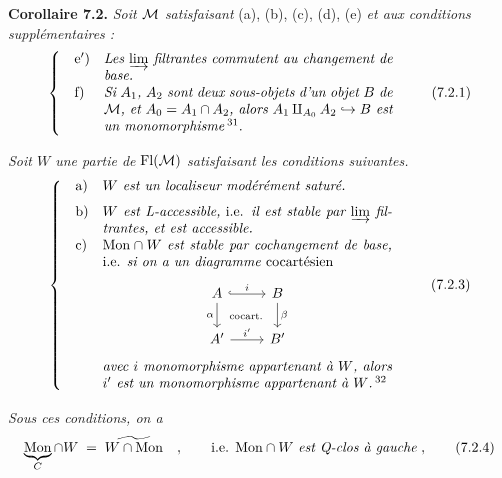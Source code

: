 \textbf{Corollaire 7.2.} \textit{Soit $\mathcal{M}$ satisfaisant} (a), (b), (c), (d), (e) \textit{et aux conditions supplémentaires :}
\[
\left\{
\begin{array}{@{\quad}l@{\quad}p{0.6\textwidth}}
\text{e$'$)} & \textit{Les $\varinjlim$ filtrantes commutent au changement de base.} \\[1.5ex]
\text{f)} & \textit{Si $A_1$, $A_2$ sont deux sous-objets d'un objet $B$ de $\M$, et $A_0 = A_1 \cap A_2$, alors $A_1 \amalg_{A_0} A_2 \hookrightarrow B$ est un monomorphisme}\,\footnotemark[31].
\end{array}
\right.
\tag*{(7.2.1)}
\]

\textit{Soit $W$ une partie de} $\mathrm{Fl}(\mathcal{M})$ \textit{satisfaisant les conditions suivantes.}
\[
\left\{
\begin{array}{@{\quad}l@{\quad}p{0.6\textwidth}}
\text{a)} & \textit{$W$ est un localiseur modérément saturé.} \\[1.5ex]
\text{b)} & \textit{$W$ est L-accessible,} i.e. \textit{il est stable par $\varinjlim$ filtrantes, et est accessible.} \\[1.5ex]
\text{c)} & $\Mon \cap W$ \textit{est stable par cochangement de base,} i.e. \textit{si on a un diagramme} cocartésien
\begin{center}
\begin{tikzcd}[ampersand replacement=\&]
A \arrow[r, hook, "i"] \arrow[d, "\alpha"'] \arrow[dr, phantom, "\scriptstyle\text{cocart.}"] \& B \arrow[d, "\beta"] \\
A' \arrow[r, "i'"] \& B'
\end{tikzcd}
\end{center}
\textit{avec $i$ monomorphisme appartenant à $W$, alors $i'$ est un monomorphisme appartenant à $W$.}\,\footnotemark[32]
\end{array}
\right.
\tag*{(7.2.3)}
\]

\textit{Sous ces conditions, on a}
\[
\underbrace{\Mon}_{C} \cap W \;=\; \widetilde{W \cap \Mon} \quad , \qquad \text{i.e. } \Mon \cap W \text{ \textit{est Q-clos à gauche}} \;,
\tag*{(7.2.4)}
\]

